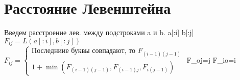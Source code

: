 \documentclass[a4paper,12pt]{article}
\theoremstyle{plain} %
\theoremstyle{definition} %
\theoremstyle{remark} %
\begin{document}
\section{Расстояние Левенштейна}
Введем расстроение лев. между подстроками a и b. 
a[:i] b[:j]
$F_{ij} = L(a[:i], b[:j])$\\
$F_{ij}=
\begin{cases}
\text{Последниие буквы совпадают, то } F_{(i-1)(j-1)}\\
1+\min(F_{(i-1)(j-1)}, F_{(i-1)j}, F_{i(j-1)})
\end{cases}
$
F_{oj}=j
F_{io}=i






















\begin{comment}
\begin{center}
	\vfill \emph{{\small Г. С. Демьянов, \href{https://vk.com/id37346992}{VK}\\
С. С. Клявинек, \href{https://vk.com/id85132547}{VK}
}}
\end{center}
\end{comment}
\end{document}
